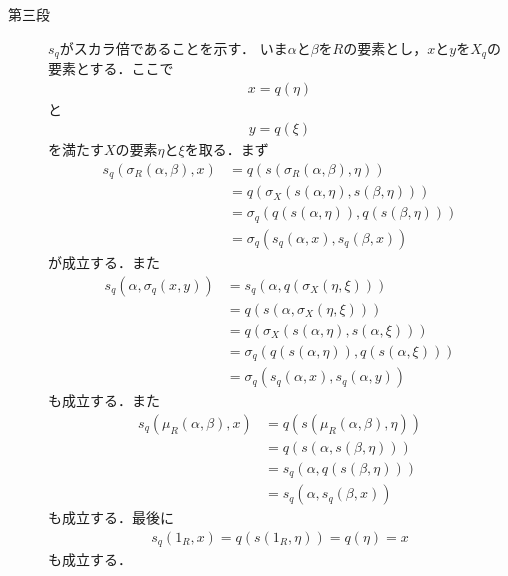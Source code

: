 \begin{sketch}
\begin{description}
			\item[第三段] $s_q$がスカラ倍であることを示す．
				いま$\alpha$と$\beta$を$R$の要素とし，$x$と$y$を$X_q$の要素とする．ここで
				\begin{align}
					x = q(\eta)
				\end{align}
				と
				\begin{align}
					y = q(\xi)
				\end{align}
				を満たす$X$の要素$\eta$と$\xi$を取る．まず
				\begin{align}
					s_q\left(\sigma_R(\alpha,\beta),x\right)
					&= q\left(s\left(\sigma_R(\alpha,\beta),\eta\right)\right) \\
					&= q\left(\sigma_X\left(s(\alpha,\eta),s(\beta,\eta)\right)\right) \\
					&= \sigma_q\left(q\left(s(\alpha,\eta)\right),q\left(s(\beta,\eta)\right)\right) \\
					&= \sigma_q\left(s_q(\alpha,x),s_q(\beta,x)\right)
				\end{align}
				が成立する．また
				\begin{align}
					s_q\left(\alpha,\sigma_q(x,y)\right)
					&= s_q\left(\alpha,q\left(\sigma_X(\eta,\xi)\right)\right) \\
					&= q\left(s\left(\alpha,\sigma_X(\eta,\xi)\right)\right) \\
					&= q\left(\sigma_X(s(\alpha,\eta),s(\alpha,\xi))\right) \\
					&= \sigma_q\left(q\left(s(\alpha,\eta)\right),q\left(s(\alpha,\xi)\right)\right) \\
					&= \sigma_q\left(s_q(\alpha,x),s_q(\alpha,y)\right)
				\end{align}
				も成立する．また
				\begin{align}
					s_q\left(\mu_R(\alpha,\beta),x\right)
					&= q\left(s\left(\mu_R(\alpha,\beta),\eta\right)\right) \\
					&= q\left(s\left(\alpha,s(\beta,\eta)\right)\right) \\
					&= s_q\left(\alpha,q\left(s(\beta,\eta)\right)\right) \\
					&= s_q\left(\alpha,s_q(\beta,x)\right)
				\end{align}
				も成立する．最後に
				\begin{align}
					s_q(1_R,x) = q\left(s(1_R,\eta)\right) = q(\eta) = x
				\end{align}
				も成立する．
				\QED
		\end{description}
	\end{sketch}